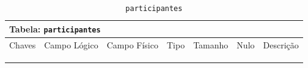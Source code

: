 \documentclass[12pt,a4paper]{article}
\begin{document}
\begin{center}
\begin{table}[h!]
	\caption{\texttt{participantes}}
	\label{tabela:participantes}
	\begin{tabular}{|p{1cm}|p{1.5cm}|p{1.25cm}|p{1.25cm}|p{1.75cm}|p{1.25cm}|p{4.5cm}|}\hline	
		\multicolumn{7}{|p{16cm}|}{\cellcolor{cinzaClaro}  \centering Tabela: \texttt{participantes}} \\ \hline %
		{\small Chaves} & {\small Campo Lógico} & {\small Campo Físico} & {\small Tipo} & {\small Tamanho} & {\small Nulo} & {\small Descrição}\\\hline %
		
		{\tiny } & {\tiny } & {\tiny } & {\tiny } & {\tiny } & {\tiny } &{\tiny }\\\hline
		{\tiny } & {\tiny } & {\tiny } & {\tiny } & {\tiny } & {\tiny } &{\tiny }\\\hline
		{\tiny } & {\tiny } & {\tiny } & {\tiny } & {\tiny } & {\tiny } &{\tiny }\\\hline
		
			
	\end{tabular}
\end{table}	
\end{center}
\end{document}
